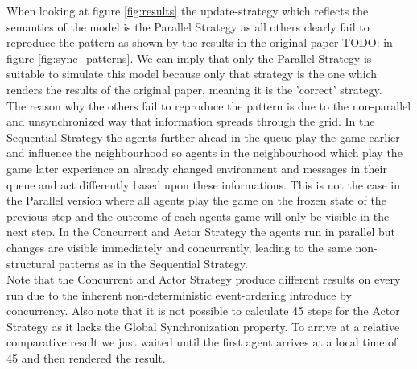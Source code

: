 

When looking at figure \ref{fig:results} the update-strategy which reflects the semantics of the model is the Parallel Strategy as all others clearly fail to reproduce the pattern as shown by the results in the original paper TODO: in figure \ref{fig:sync_patterns}. We can imply that only the Parallel Strategy is suitable to simulate this model because only that strategy is the one which renders the results of the original paper, meaning it is the 'correct' strategy. \\
The reason why the others fail to reproduce the pattern is due to the non-parallel and unsynchronized way that information spreads through the grid. In the Sequential Strategy the agents further ahead in the queue play the game earlier and influence the neighbourhood so agents in the neighbourhood which play the game later experience an already changed environment and  messages in their queue and act differently based upon these informations. This is not the case in the Parallel version where all agents play the game on the frozen state of the previous step and the outcome of each agents game will only be visible in the next step. In the Concurrent and Actor Strategy the agents run in parallel but changes are visible immediately and concurrently, leading to the same non-structural patterns as in the Sequential Strategy. \\
Note that the Concurrent and Actor Strategy produce different results on every run due to the inherent non-deterministic event-ordering introduce by concurrency. Also note that it is not possible to calculate 45 steps for the Actor Strategy as it lacks the Global Synchronization property. To arrive at a relative comparative result we just waited until the first agent arrives at a local time of 45 and then rendered the result. 

